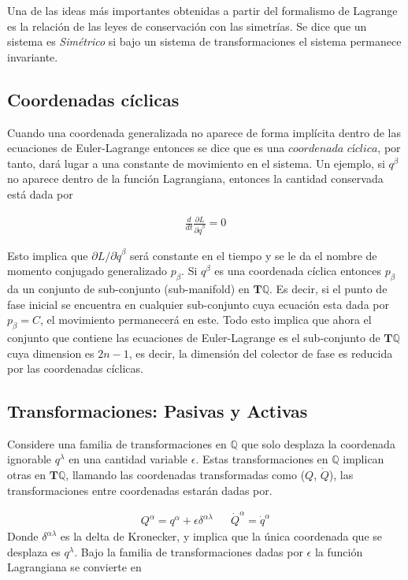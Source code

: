 Una de las ideas más importantes obtenidas a partir del formalismo de Lagrange es la relación de las leyes de conservación con las simetrías. Se dice que un sistema es \textit{Simétrico} si bajo un sistema de transformaciones el sistema permanece invariante. 

\subsection[short]{Coordenadas cíclicas}

Cuando una coordenada generalizada no aparece de forma implícita dentro de las ecuaciones de Euler-Lagrange entonces se dice que es una $\textit{coordenada cíclica}$, por tanto, dará lugar a una constante de movimiento en el sistema. Un ejemplo, si $q^{\beta}$ no aparece dentro de la función Lagrangiana, entonces la cantidad conservada está dada por

\begin{gather*}
    \frac{d}{dt}\frac{\partial L}{\partial \dot{q}^{\beta}} = 0
\end{gather*}

Esto implica que $\partial L/ \partial \dot{q}^\beta$ será constante en el tiempo y se le da el nombre de momento conjugado generalizado $p_\beta$. Si $q^{\beta}$ es una coordenada cíclica entonces $p_\beta$ da un conjunto de sub-conjunto (sub-manifold) en $\mathbf{T}\mathbb{Q}$. Es decir, si el punto de fase inicial se encuentra en cualquier sub-conjunto cuya ecuación esta dada por $p_\beta = C$, el movimiento permanecerá en este. Todo esto implica que ahora el conjunto que contiene las ecuaciones de Euler-Lagrange es el sub-conjunto de $\mathbf{T}\mathbb{Q}$ cuya dimension  es $2n - 1$, es decir, la dimensión del colector de fase es reducida por las coordenadas cíclicas.

\subsection[short]{Transformaciones: Pasivas y Activas}

Considere una familia de transformaciones en $\mathbb{Q}$ que solo desplaza la coordenada ignorable $q^{\lambda}$ en una cantidad variable $\epsilon$. Estas transformaciones en $\mathbb{Q}$ implican otras en $\mathbf{T}\mathbb{Q}$, llamando las coordenadas transformadas como ($Q$, $\dot{Q}$), las transformaciones entre coordenadas estarán dadas por.

\begin{align*}
    Q^{\alpha} = q^{\alpha} + \epsilon\delta^{\alpha\lambda} && \dot{Q}^{\alpha} = \dot{q}^{\alpha}
\end{align*}
Donde $\delta^{\alpha\lambda}$ es la delta de Kronecker, y implica que la única coordenada que se desplaza es $q^{\lambda}$. Bajo la familia de transformaciones dadas por $\epsilon$ la función Lagrangiana se convierte en 

